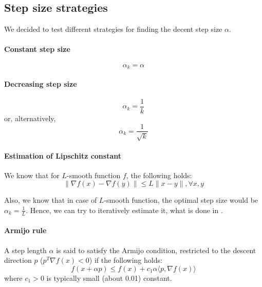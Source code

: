 \documentclass{article}
\begin{document}
\subsection{Step size strategies}

We decided to test different strategies for finding the decent step size $\alpha$.

\paragraph{Constant step size}
\begin{equation*}
  \alpha_k = \alpha
\end{equation*}

\paragraph{Decreasing step size}
\begin{equation*}
  \alpha_k = \frac{1}{k}
\end{equation*}
or, alternatively,
\begin{equation*}
  \alpha_k = \frac{1}{\sqrt{k}}
\end{equation*}

\paragraph{Estimation of Lipschitz constant}
We know that for $L$-smooth function $f$, the following holds:
\begin{equation*}
  \|\nabla f(x) -\nabla f(y)\| \leq L  \|x -  y\|, \forall x,y
\end{equation*}

Also, we know that in case of $L$-smooth function, the optimal step size would be $\alpha_k = \frac{1}{L}$.
Hence, we can try to iteratively estimate it, what is done in .

\paragraph{Armijo rule}

A step length $\alpha$ is said to satisfy the Armijo condition, restricted to the descent direction $p$ ($p^T \nabla f(x) < 0$) if the following holds:
\begin{equation}\label{eq:armijo}
  f(x + \alpha p) \leq f(x) + c_1 \alpha \langle p, \nabla f(x) \rangle
\end{equation}
where $c_1 > 0$ is typically small (about 0.01) constant.
\end{document}
